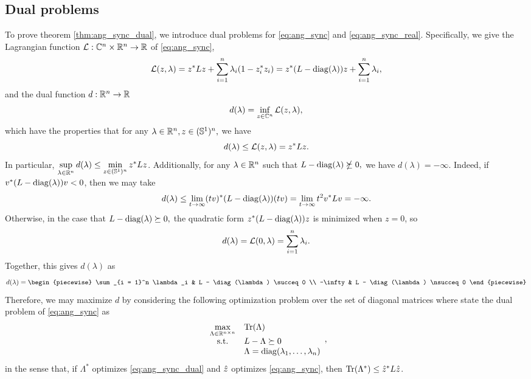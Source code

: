 \subsection{Dual problems}
To prove theorem \ref{thm:ang_sync_dual}, we introduce dual problems for \eqref{eq:ang_sync} and \eqref{eq:ang_sync_real}.  Specifically, we give the Lagrangian function $\mathcal{L} : \mathbb{C}^n \times \mathbb{R}^n \to \mathbb{R}$ of \eqref{eq:ang_sync}, \[\mathcal{L}(z, \lambda) = z^* L z + \sum_{i = 1}^n \lambda_i (1 - z_i^* z_i) = z^*(L - \operatorname{diag}(\lambda)) z + \sum_{i = 1}^n \lambda_i,\] and the dual function $d : \mathbb{R}^n \to \mathbb{R}$ \[d(\lambda) = \inf_{z \in \mathbb{C}^n} \mathcal{L}(z, \lambda),\] which have the properties that for any $\lambda \in \mathbb{R}^n, z \in (\mathbb{S}^1)^n,$ we have \[d(\lambda) \le \mathcal{L}(z, \lambda) = z^* L z.\]  In particular, $\sup\limits_{\lambda \in \mathbb{R}^n} d(\lambda) \le \min\limits_{z \in (\mathbb{S}^1)^n} z^* L z$.  Additionally, for any $\lambda \in \mathbb{R}^n$ such that $L - \operatorname{diag}(\lambda) \nsucceq 0,$ we have $d(\lambda) = - \infty$.  Indeed, if $v^*(L - \operatorname{diag}(\lambda))v < 0$, then we may take \[d(\lambda) \le \lim_{t \to \infty} (tv)^* (L - \operatorname{diag}(\lambda)) (tv) = \lim_{t \to \infty} t^2 v^* L v = -\infty.\]  Otherwise, in the case that $L - \operatorname{diag}(\lambda) \succeq 0,$ the quadratic form $z^* (L - \operatorname{diag}(\lambda)) z$ is minimized when $z = 0$, so \[d(\lambda) = \mathcal{L}(0, \lambda) = \sum_{i = 1}^n \lambda_i.\]  Together, this gives $d(\lambda)$ as \[d(\lambda) = \begin{piecewise} \sum_{i = 1}^n \lambda_i & L - \diag(\lambda) \succeq 0 \\ -\infty & L - \diag(\lambda) \nsucceq 0 \end{piecewise}\]   Therefore, we may maximize $d$ by considering the following optimization problem over the set of diagonal matrices where state the dual problem of \eqref{eq:ang_sync} as
\begin{equation}
  \begin{array}{cl} \max\limits_{\Lambda \in \mathbb{R}^{n \times n}} & \operatorname{Tr}(\Lambda) \\
    \text{s.t.} & L - \Lambda \succeq 0 \\
    & \Lambda = \operatorname{diag}(\lambda_1, \ldots, \lambda_n)
  \end{array}, \label{eq:ang_sync_dual}
\end{equation}
in the sense that, if $\Lambda^*$ optimizes \eqref{eq:ang_sync_dual} and $\hat{z}$ optimizes \eqref{eq:ang_sync}, then $\operatorname{Tr}(\Lambda^*) \le \hat{z}^* L \hat{z}$.  

